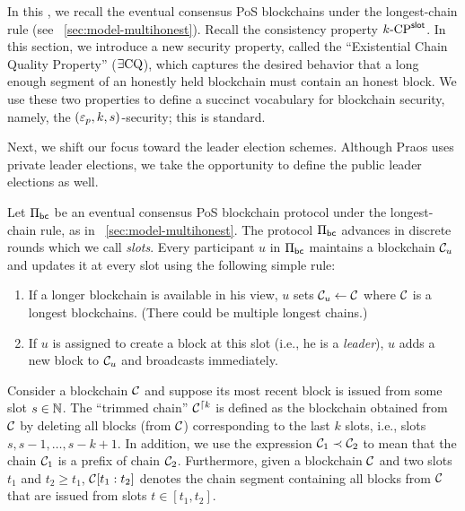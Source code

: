 

In this \Section, 
we recall the eventual consensus PoS blockchains under the longest-chain rule 
(see \Section~\ref{sec:model-multihonest}). 
Recall the consistency property ${k}\text{-}\mathrm{CP}^{\mathsf{slot}}$. 
In this section, we introduce a new security property, called the ``Existential Chain Quality Property'' ($\exists\mathrm{CQ}$), 
which captures the desired behavior that a long enough segment of an honestly held blockchain 
must contain an honest block. 
We use these two properties to define a succinct vocabulary for blockchain security, 
namely, the $(\mathsf{\varepsilon}_p, k, s)$-security; this is standard.

Next, we shift our focus toward the leader election schemes. 
Although Praos uses private leader elections, 
we take the opportunity to define the public leader elections as well. 


    Let $\Pi_\mathsf{bc}$ be an eventual consensus PoS blockchain protocol 
    under the longest-chain rule, 
    as in \Section~\ref{sec:model-multihonest}. 
    The protocol $\Pi_\mathsf{bc}$ advances in discrete rounds 
    which we call \emph{slots}.
    Every participant $u$ in $\Pi_\mathsf{bc}$ 
    maintains a blockchain $\mathcal{C}_u$ 
    and updates it at every slot using the following simple rule: 
    \begin{enumerate}
      \item If a longer blockchain is available in his view, 
      $u$ sets $\mathcal{C}_u \leftarrow \mathcal{C}$ where 
      $\mathcal{C}$ is a longest blockchains. 
      (There could be multiple longest chains.)

      \item If $u$ is assigned to create a block at this slot 
      (i.e., he is a \emph{leader}),
      $u$ adds a new block to $\mathcal{C}_u$ and broadcasts immediately.
    \end{enumerate}

    Consider a blockchain $\mathcal{C}$ and suppose its most recent block is issued from some slot $s \in \mathbb{N}$. 
    The ``trimmed chain'' $\mathcal{C}^{\lceil {k}}$ is defined as 
    the blockchain obtained from $\mathcal{C}$ by deleting all blocks (from $\mathcal{C}$) 
    corresponding to the last $k$ slots, i.e., slots $s, s - 1, \ldots, s - k + 1$. 
    In addition, we use the expression $\mathcal{C}_1 \prec \mathcal{C}_2$ to mean that 
    the chain $\mathcal{C}_1$ is a prefix of chain $\mathcal{C}_2$. 
    Furthermore, given a blockchain $\mathcal{C}$ and two slots $t_1$ and $t_2 \geq t_1$, 
    $\mathcal{C}[t_1 : t_2]$ denotes the chain segment containing all blocks from $\mathcal{C}$ 
    that are issued from slots $t \in [t_1, t_2]$.

